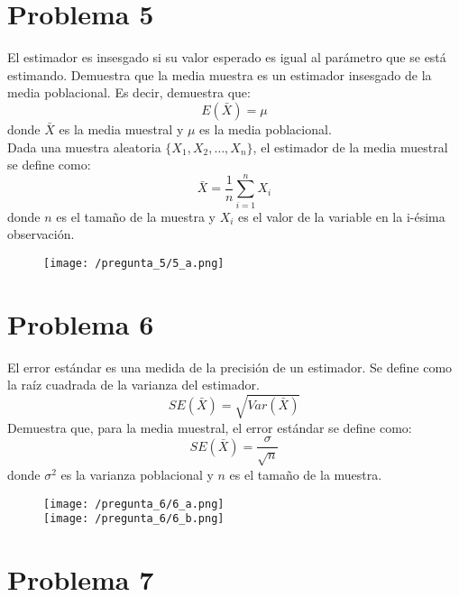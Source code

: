 \documentclass[]{article}
\begin{document}
\section*{Problema 5}

El estimador es insesgado si su valor esperado es igual al parámetro que se está estimando. Demuestra que la media muestra es un estimador insesgado de la media poblacional. Es decir, demuestra que: 
$$E(\bar{X})=\mu$$
donde $\bar{X}$ es la media muestral y $\mu$ es la media poblacional.
\\
Dada una muestra aleatoria $\{X_1, X_2, \ldots, X_n\}$, el estimador de la media muestral se define como: 
$$
\bar{X}	=	\frac{1}{n}	\sum_{i=1}^{n}	X_i
$$
donde $n$ es el tamaño de la muestra y $X_i$ es el valor de la variable en la i-ésima observación.

	\begin{figure}[H]
	\texttt{[image: /pregunta\_5/5\_a.png]}
	\end{figure}

\section*{Problema 6}

El error estándar es una medida de la precisión de un estimador. Se define como la raíz cuadrada de la varianza del estimador. 
$$
SE(\bar{X})=\sqrt{Var(\bar{X})}
$$
Demuestra que, para la media muestral, el error estándar se define como: 
$$
SE(\bar{X})=\frac{\sigma}{\sqrt{n}}
$$
donde $\sigma^2$ es la varianza poblacional y $n$ es el tamaño de la muestra.

	\begin{figure}[H]
	\texttt{[image: /pregunta\_6/6\_a.png]}
	\\
	\texttt{[image: /pregunta\_6/6\_b.png]}
	\end{figure}

\section*{Problema 7}
\end{document}
